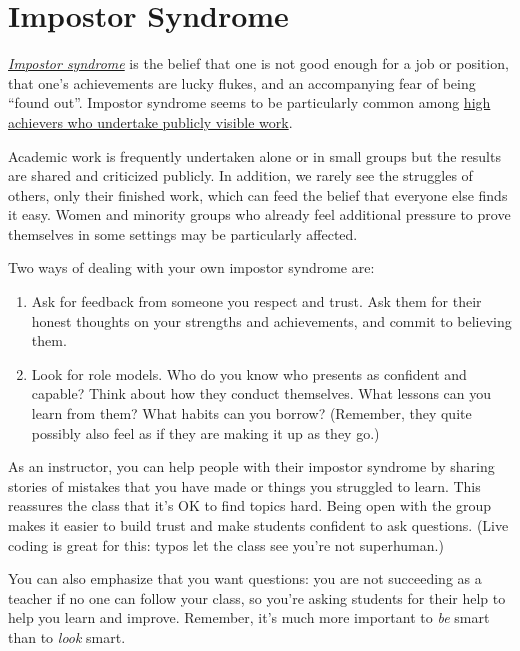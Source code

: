 \documentclass[10pt,statementpaper]{memoir}
\begin{document}
\section{Impostor Syndrome}\label{impostor-syndrome}

\emph{\href{gloss.html\#impostor-syndrome}{Impostor syndrome}} is the
belief that one is not good enough for a job or position, that one's
achievements are lucky flukes, and an accompanying fear of being ``found
out''. Impostor syndrome seems to be particularly common among
\href{https://www.usenix.org/blog/impostor-syndrome-proof-yourself-and-your-community}{high
achievers who undertake publicly visible work}.

Academic work is frequently undertaken alone or in small groups but the
results are shared and criticized publicly. In addition, we rarely see
the struggles of others, only their finished work, which can feed the
belief that everyone else finds it easy. Women and minority groups who
already feel additional pressure to prove themselves in some settings
may be particularly affected.

Two ways of dealing with your own impostor syndrome are:

\begin{enumerate}
\def\labelenumi{\arabic{enumi}.}
\item
  Ask for feedback from someone you respect and trust. Ask them for
  their honest thoughts on your strengths and achievements, and commit
  to believing them.
\item
  Look for role models. Who do you know who presents as confident and
  capable? Think about how they conduct themselves. What lessons can you
  learn from them? What habits can you borrow? (Remember, they quite
  possibly also feel as if they are making it up as they go.)
\end{enumerate}

As an instructor, you can help people with their impostor syndrome by
sharing stories of mistakes that you have made or things you struggled
to learn. This reassures the class that it's OK to find topics hard.
Being open with the group makes it easier to build trust and make
students confident to ask questions. (Live coding is great for this:
typos let the class see you're not superhuman.)

You can also emphasize that you want questions: you are not succeeding
as a teacher if no one can follow your class, so you're asking students
for their help to help you learn and improve. Remember, it's much more
important to \emph{be} smart than to \emph{look} smart.
\end{document}
